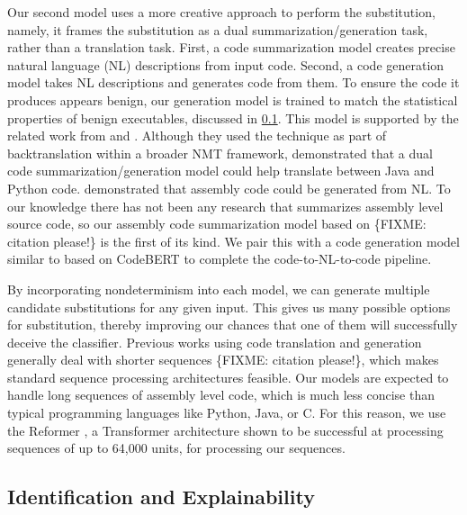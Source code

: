 \documentclass[conference]{IEEEtran}
\begin{document}
Our second model uses a more creative approach to perform the substitution, namely, it frames the substitution as a dual summarization/generation task, rather than a translation task. First, a code summarization model creates precise natural language (NL) descriptions from input code. Second, a code generation model takes NL descriptions and generates code from them. To ensure the code it produces appears benign, our generation model is trained to match the statistical properties of benign executables, discussed in \ref{sec:Proposal:Identification}. This model is supported by the related work from \cite{ahmad2022summarize} and \cite{liguori2022can}. Although they used the technique as part of backtranslation within a broader NMT framework, \cite{ahmad2022summarize} demonstrated that a dual code summarization/generation model could help translate between Java and Python code. \cite{liguori2022can} demonstrated that assembly code could be generated from NL. To our knowledge there has not been any research that summarizes assembly level source code, so our assembly code summarization model based on \{FIXME: citation please!\} is the first of its kind. We pair this with a code generation model similar to \cite{liguori2022can} based on CodeBERT \cite{feng2020codebert} to complete the code-to-NL-to-code pipeline.  

By incorporating nondeterminism into each model, we can generate multiple candidate substitutions for any given input. This gives us many possible options for substitution, thereby improving our chances that one of them will successfully deceive the classifier. Previous works using code translation and generation generally deal with shorter sequences \{FIXME: citation please!\}, which makes standard sequence processing architectures feasible. Our models are expected to handle long sequences of assembly level code, which is much less concise than typical programming languages like Python, Java, or C. For this reason, we use the Reformer \cite{kitaev2020reformer}, a Transformer architecture shown to be successful at processing sequences of up to 64,000 units, for processing our sequences.

\subsection{Identification and Explainability}
\label{sec:Proposal:Identification}
\end{document}
